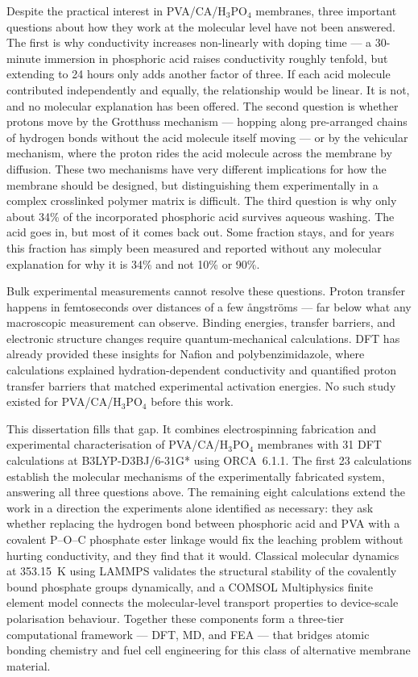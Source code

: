 \documentclass[12pt,a4paper]{report}
\begin{document}
Despite the practical interest in PVA/CA/H\(_3\)PO\(_4\) 
membranes, three important questions about how they 
work at the molecular level have not been answered. 
The first is why conductivity increases non-linearly 
with doping time — a 30-minute immersion in phosphoric 
acid raises conductivity roughly tenfold, but 
extending to 24 hours only adds another factor of 
three. If each acid molecule contributed independently 
and equally, the relationship would be linear. It is 
not, and no molecular explanation has been 
offered.\cite{16,17} The second question is whether 
protons move by the Grotthuss mechanism — hopping 
along pre-arranged chains of hydrogen bonds without 
the acid molecule itself moving — or by the vehicular 
mechanism, where the proton rides the acid molecule 
across the membrane by diffusion. These two mechanisms 
have very different implications for how the membrane 
should be designed, but distinguishing them 
experimentally in a complex crosslinked polymer matrix 
is difficult.\cite{16,17} The third question is why 
only about 34\% of the incorporated phosphoric acid 
survives aqueous washing. The acid goes in, but most 
of it comes back out. Some fraction stays, and for 
years this fraction has simply been measured and 
reported without any molecular explanation for why 
it is 34\% and not 10\% or 
90\%.\cite{35,52}

Bulk experimental measurements cannot resolve these 
questions. Proton transfer happens in femtoseconds 
over distances of a few ångströms — far below what 
any macroscopic measurement can observe. Binding 
energies, transfer barriers, and electronic structure 
changes require quantum-mechanical calculations. DFT 
has already provided these insights for Nafion and 
polybenzimidazole, where calculations explained 
hydration-dependent conductivity and quantified 
proton transfer barriers that matched experimental 
activation energies.\cite{18,19} No such study existed 
for PVA/CA/H\(_3\)PO\(_4\) before this work.

This dissertation fills that gap. It combines 
electrospinning fabrication and experimental 
characterisation of PVA/CA/H\(_3\)PO\(_4\) membranes 
with 31 DFT calculations at B3LYP-D3BJ/6-31G* using 
ORCA~6.1.1.\cite{20,21} The first 23 calculations 
establish the molecular mechanisms of the 
experimentally fabricated system, answering all three 
questions above. The remaining eight calculations 
extend the work in a direction the experiments alone 
identified as necessary: they ask whether replacing 
the hydrogen bond between phosphoric acid and PVA 
with a covalent P--O--C phosphate ester linkage would 
fix the leaching problem without hurting conductivity, 
and they find that it would. Classical molecular 
dynamics at 353.15~K using LAMMPS validates the 
structural stability of the covalently bound 
phosphate groups dynamically, and a COMSOL 
Multiphysics finite element model connects the 
molecular-level transport properties to device-scale 
polarisation behaviour. Together these components 
form a three-tier computational framework — DFT, 
MD, and FEA — that bridges atomic bonding chemistry 
and fuel cell engineering for this class of 
alternative membrane material.\cite{18,19}
\end{document}

